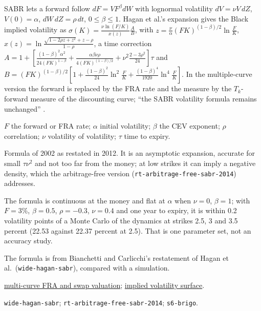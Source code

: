 \begin{qfmodel}\label{mod:sabr-smile}
 SABR lets a forward follow $dF=V F^\beta dW$ with lognormal volatility $dV=\nu V\,dZ$, $V(0)=\alpha$, $dW\,dZ=\rho\,dt$, $0\le\beta\le1$. Hagan et al.'s expansion gives the Black implied volatility as $\sigma(K)=\frac{\nu\ln(F/K)}{x(z)}\frac{A}{B}$, with $z=\frac\nu\alpha(FK)^{(1-\beta)/2}\ln\frac FK$, $x(z)=\ln\frac{\sqrt{1-2\rho z+z^2}+z-\rho}{1-\rho}$, a time correction $A=1+[\frac{(1-\beta)^2\alpha^2}{24(FK)^{1-\beta}}+\frac{\alpha\beta\nu\rho}{4(FK)^{(1-\beta)/2}}+\nu^2\frac{2-3\rho^2}{24}]\tau$ and $B=(FK)^{(1-\beta)/2}[1+\frac{(1-\beta)^2}{24}\ln^2\frac FK+\frac{(1-\beta)^4}{1920}\ln^4\frac FK]$. In the multiple-curve version the forward is replaced by the FRA rate and the measure by the $T_k$-forward measure of the discounting curve; ``the SABR volatility formula remains unchanged'' \citep[arXiv 1103.2567, version of 28 March 2012, sec.~4.5, Table~5, p.~18]{gap-rates-multicurve-sabr}.

 $F$ the forward or FRA rate; $\alpha$ initial volatility; $\beta$ the CEV exponent; $\rho$ correlation; $\nu$ volatility of volatility; $\tau$ time to expiry.

 Formula of 2002 as restated in 2012. It is an asymptotic expansion, accurate for small $\tau\nu^2$ and not too far from the money; at low strikes it can imply a negative density, which the arbitrage-free version (\nolinkurl{rt-arbitrage-free-sabr-2014}) addresses.

 The formula is continuous at the money and flat at $\alpha$ when $\nu=0$, $\beta=1$; with $F=3\%$, $\beta=0.5$, $\rho=-0.3$, $\nu=0.4$ and one year to expiry, it is within 0.2 volatility points of a Monte Carlo of the dynamics at strikes 2.5, 3 and 3.5 percent (22.53 against 22.37 percent at 2.5). That is one parameter set, not an accuracy study.

 The formula is from Bianchetti and Carlicchi's restatement of Hagan et al.\ (\nolinkurl{wide-hagan-sabr}), compared with a simulation.

 \hyperref[mod:multi-curve-fra-swap-valuation]{multi-curve FRA and swap valuation}; \hyperref[def:implied-volatility-surface]{implied volatility surface}.

 \nolinkurl{wide-hagan-sabr}; \nolinkurl{rt-arbitrage-free-sabr-2014}; \nolinkurl{s6-brigo}.

\end{qfmodel}
